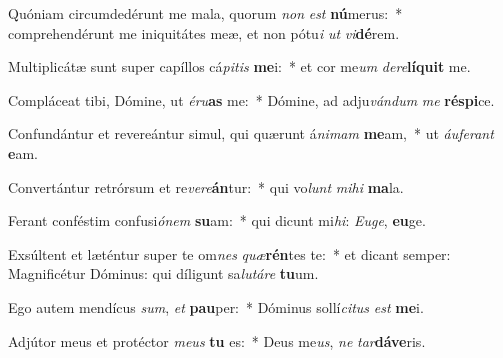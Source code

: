 \item Quóniam circumdedérunt me mala, quorum \textit{non} \textit{est} \textbf{nú}merus:~* comprehendérunt me iniquitátes meæ, et non pótu\textit{i} \textit{ut} \textit{vi}\textbf{dé}rem.
\item Multiplicátæ sunt super capíllos cá\textit{pi}\textit{tis} \textbf{me}i:~* et cor me\textit{um} \textit{de}\textit{re}\textbf{lí}\textbf{quit} me.
\item Compláceat tibi, Dómine, ut \textit{é}\textit{ru}\textbf{as} me:~* Dómine, ad adju\textit{ván}\textit{dum} \textit{me} \textbf{ré}\textbf{spi}ce.
\item Confundántur et revereántur simul, qui quærunt á\textit{ni}\textit{mam} \textbf{me}am,~* ut \textit{áu}\textit{fe}\textit{rant} \textbf{e}am.
\item Convertántur retrórsum et re\textit{ve}\textit{re}\textbf{án}tur:~* qui vo\textit{lunt} \textit{mi}\textit{hi} \textbf{ma}la.
\item Ferant conféstim confusi\textit{ó}\textit{nem} \textbf{su}am:~* qui dicunt mi\textit{hi}: \textit{Eu}\textit{ge}, \textbf{eu}ge.
\item Exsúltent et læténtur super te om\textit{nes} \textit{quæ}\textbf{rén}tes te:~* et dicant semper: Magnificétur Dóminus: qui díligunt sa\textit{lu}\textit{tá}\textit{re} \textbf{tu}um.
\item Ego autem mendícus \textit{sum}, \textit{et} \textbf{pau}per:~* Dóminus sollí\textit{ci}\textit{tus} \textit{est} \textbf{me}i.
\item Adjútor meus et protéctor \textit{me}\textit{us} \textbf{tu} es:~* Deus me\textit{us}, \textit{ne} \textit{tar}\textbf{dá}\textbf{ve}ris.
